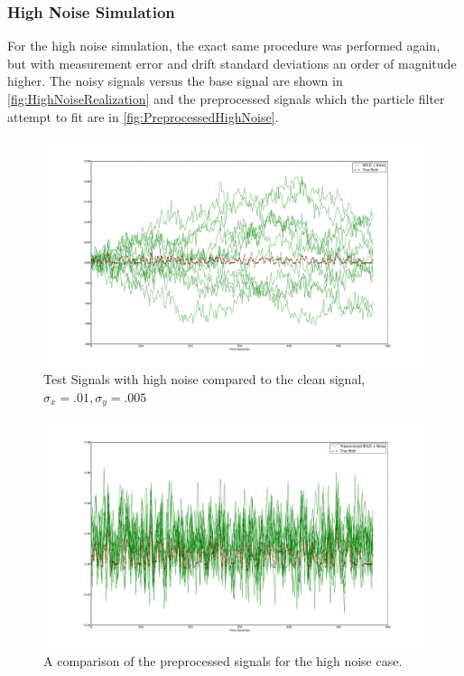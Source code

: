 \subsubsection{High Noise Simulation}
For the high noise simulation, the exact same procedure was performed again, but with 
measurement error and drift standard
deviations an order of magnitude higher. The noisy signals versus the base signal are shown
in \autoref{fig:HighNoiseRealization} and the preprocessed signals which the particle
filter attempt to fit are in \autoref{fig:PreprocessedHighNoise}.
\begin{figure}[H]
\label{fig:LowNoiseRealization}
\includegraphics[trim=6cm 3cm 6cm 3cm,width=16cm]{images/realization_highnoise}
\caption{Test Signals with high noise compared to the clean signal, $\sigma_x = .01, \sigma_y=.005$}
\end{figure}
\begin{figure}[H]
\label{fig:PreprocessedHighNoise}
\includegraphics[trim=6cm 3cm 6cm 3cm,width=16cm]{images/preprocessed_highnoise}
\caption{A comparison of the preprocessed signals for the high noise case.}
\end{figure}

